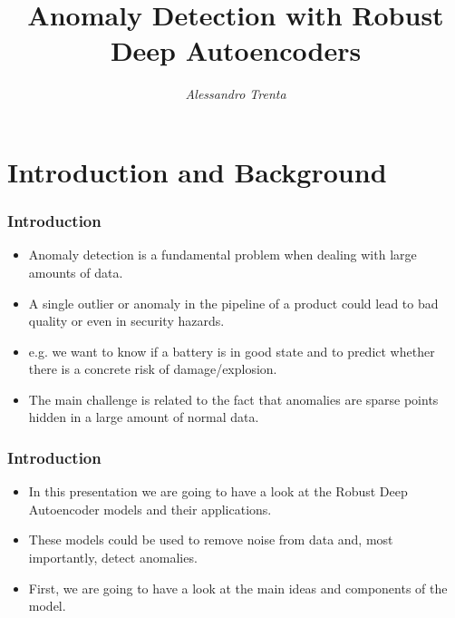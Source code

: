 \documentclass{beamer}
\title[Anomaly Detection with Robust Deep Autoencoders]{Anomaly Detection with Robust Deep Autoencoders} %
\subtitle[]{}
\author[Alessandro Trenta]{\emph{Alessandro Trenta}} %
\institute[] %
{ \\ %
}
\date{} %
\theoremstyle{plain}
\theoremstyle{definition}
\theoremstyle{remark}
\begin{document}
\begin{frame}
	\titlepage %
\end{frame}

\begin{frame}
	\tableofcontents
\end{frame}

\nocite{RAE}

\section{Introduction and Background}

\begin{frame}
    \frametitle{Introduction}
    \begin{itemize}
        \item Anomaly detection is a fundamental problem when dealing with large amounts of data.
        \item A single outlier or anomaly in the pipeline of a product could lead to bad quality or even in security hazards.
        \item e.g. we want to know if a battery is in good state and to predict whether there is a concrete risk of damage/explosion.
        \item The main challenge is related to the fact that anomalies are sparse points hidden in a large amount of normal data.
    \end{itemize}
\end{frame}

\begin{frame}
    \frametitle{Introduction}
    \begin{itemize}
        \item In this presentation we are going to have a look at the Robust Deep Autoencoder models \cite{RAE} and their applications.
        \item These models could be used to remove noise from data and, most importantly, detect anomalies.
        \item First, we are going to have a look at the main ideas and components of the model.
    \end{itemize}
\end{frame}
\end{document}
